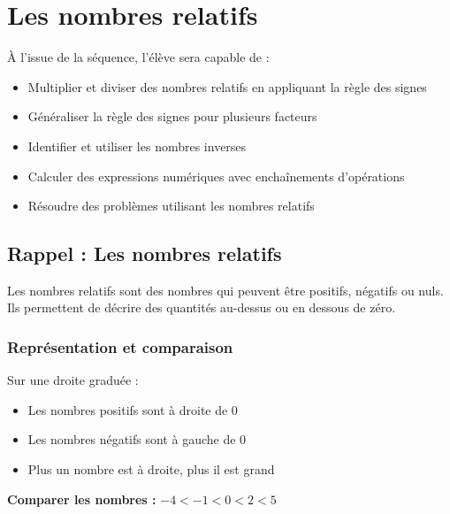 \chapter{Les nombres relatifs}

\begin{objectifsbox}
À l'issue de la séquence, l'élève sera capable de :
\begin{itemize}
\item Multiplier et diviser des nombres relatifs en appliquant la règle des signes
\item Généraliser la règle des signes pour plusieurs facteurs
\item Identifier et utiliser les nombres inverses
\item Calculer des expressions numériques avec enchaînements d'opérations
\item Résoudre des problèmes utilisant les nombres relatifs
\end{itemize}
\end{objectifsbox}

\section{Rappel : Les nombres relatifs}

\begin{remarkbox}[Rappel de 5e]
Les nombres relatifs sont des nombres qui peuvent être positifs, négatifs ou nuls. Ils permettent de décrire des quantités au-dessus ou en dessous de zéro.
\end{remarkbox}

\subsection{Représentation et comparaison}

\begin{proprietebox}
Sur une droite graduée :
\begin{itemize}[label = \textbullet]
\item Les nombres positifs sont à droite de 0
\item Les nombres négatifs sont à gauche de 0
\item Plus un nombre est à droite, plus il est grand
\end{itemize}
\end{proprietebox}

\begin{examplebox}
\textbf{Comparer les nombres :} $-4 < -1 < 0 < 2 < 5$

\begin{center}
\end{center}
\end{examplebox}

